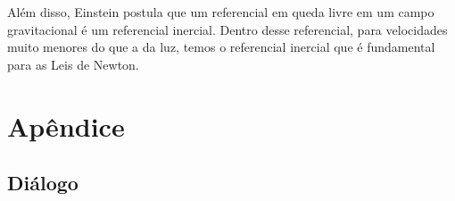 Além disso, Einstein postula que um referencial em queda livre em um campo gravitacional é um referencial inercial. Dentro desse referencial, para velocidades muito menores do que a da luz, temos o referencial inercial que é fundamental para as Leis de Newton.



\section{Apêndice}

\subsection{Diálogo}
\label{Sec:TextoDialogo}


